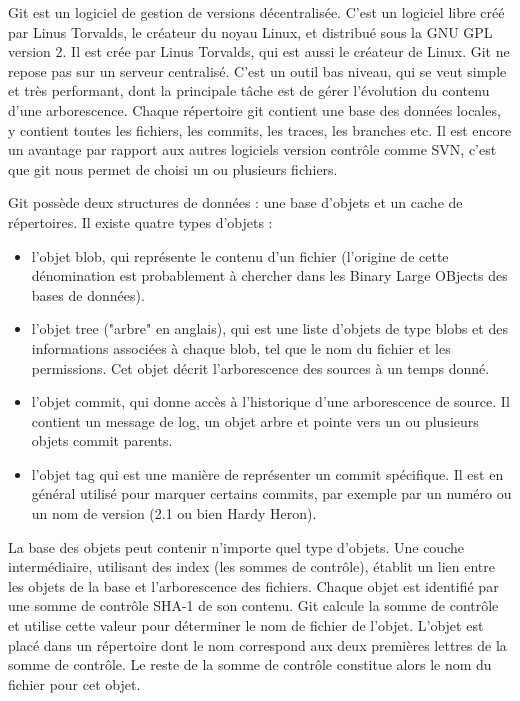 Git est un logiciel de gestion de versions décentralisée. C'est un logiciel libre créé par Linus Torvalds, le créateur du noyau Linux, et distribué sous la GNU GPL version 2. Il est crée par Linus Torvalds, qui est aussi le créateur de Linux. Git ne repose pas sur un serveur centralisé. C'est un outil bas niveau, qui se veut simple et très performant, dont la principale tâche est de gérer l'évolution du contenu d'une arborescence. Chaque répertoire git contient une base des données locales, y contient toutes les fichiers, les commits, les traces, les branches etc. Il est encore un avantage par rapport aux autres logiciels version contrôle comme SVN, c'est que git nous permet de choisi un ou plusieurs fichiers. 

Git possède deux structures de données : une base d'objets et un cache de répertoires. Il existe quatre types d'objets :

\begin{itemize}
	\item l'objet blob, qui représente le contenu d'un fichier (l'origine de cette dénomination est probablement à chercher dans les Binary Large OBjects des bases de données).
	\item l'objet tree ("arbre" en anglais), qui est une liste d'objets de type blobs et des informations associées à chaque blob, tel que le nom du fichier et les permissions. Cet objet décrit l'arborescence des sources à un temps donné.
	\item l'objet commit, qui donne accès à l'historique d'une arborescence de source. Il contient un message de log, un objet arbre et pointe vers un ou plusieurs objets commit parents.
	\item l'objet tag qui est une manière de représenter un commit spécifique. Il est en général utilisé pour marquer certains commits, par exemple par un numéro ou un nom de version (2.1 ou bien Hardy Heron).
\end{itemize}

La base des objets peut contenir n'importe quel type d'objets. Une couche intermédiaire, utilisant des index (les sommes de contrôle), établit un lien entre les objets de la base et l'arborescence des fichiers.
Chaque objet est identifié par une somme de contrôle SHA-1 de son contenu. Git calcule la somme de contrôle et utilise cette valeur pour déterminer le nom de fichier de l'objet. L'objet est placé dans un répertoire dont le nom correspond aux deux premières lettres de la somme de contrôle. Le reste de la somme de contrôle constitue alors le nom du fichier pour cet objet.

